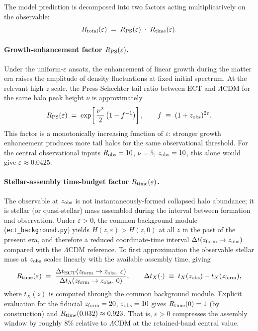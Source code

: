 The model prediction is decomposed into two factors acting
multiplicatively on the observable:
\begin{equation}
R_{\rm total}(\varepsilon)
\;=\;
R_{\rm PS}(\varepsilon)
\;\cdot\;
R_{\rm time}(\varepsilon).
\label{eq:R_total_jwst}
\end{equation}

\paragraph{Growth-enhancement factor $R_{\rm PS}(\varepsilon)$.}
Under the uniform-$\varepsilon$ ansatz, the enhancement of linear
growth during the matter era raises the amplitude of density
fluctuations at fixed initial spectrum. At the relevant high-$z$
scale, the Press-Schechter tail ratio between ECT and $\Lambda$CDM
for the same halo peak height $\nu$ is approximately
\begin{equation}
R_{\rm PS}(\varepsilon)
\;=\;
\exp\!\left[\,\frac{\nu^2}{2}\,\bigl(1 - f^{-1}\bigr)\right],
\qquad
f \;\equiv\; (1 + z_{\rm obs})^{2\varepsilon}.
\label{eq:R_PS}
\end{equation}
This factor is a monotonically increasing function of $\varepsilon$:
stronger growth enhancement produces more tail halos for the same
observational threshold. For the central observational inputs
$R_{\rm obs} = 10$, $\nu = 5$, $z_{\rm obs} = 10$, this alone would
give $\varepsilon \approx 0.0425$.


\paragraph{Stellar-assembly time-budget factor
$R_{\rm time}(\varepsilon)$.}
The observable at $z_{\rm obs}$ is not instantaneously-formed
collapsed halo abundance; it is stellar (or quasi-stellar) mass
assembled during the interval between formation and observation.
Under $\varepsilon > 0$, the common background module
(\texttt{ect\_background.py}) yields $H(z, \varepsilon) > H(z, 0)$
at all $z$ in the past of the present era, and therefore a reduced
coordinate-time interval $\Delta t(z_{\rm form} \to z_{\rm obs})$
compared with the $\Lambda$CDM reference. To first approximation
the observable stellar mass at $z_{\rm obs}$ scales linearly with
the available assembly time, giving
\begin{equation}
R_{\rm time}(\varepsilon)
\;=\;
\frac{\Delta t_{\rm ECT}(z_{\rm form} \to z_{\rm obs},\,\varepsilon)}
     {\Delta t_{\Lambda}(z_{\rm form} \to z_{\rm obs},\,0)},
\qquad
\Delta t_X(\cdot)
\;\equiv\; t_X(z_{\rm obs}) - t_X(z_{\rm form}),
\label{eq:R_time}
\end{equation}
where $t_X(z)$ is computed through the common background module.
Explicit evaluation for the fiducial $z_{\rm form} = 20$,
$z_{\rm obs} = 10$ gives $R_{\rm time}(0) = 1$ (by construction)
and $R_{\rm time}(0.032) \approx 0.923$. That is, $\varepsilon > 0$
compresses the assembly window by roughly $8\%$ relative to
$\Lambda$CDM at the retained-band central value.

